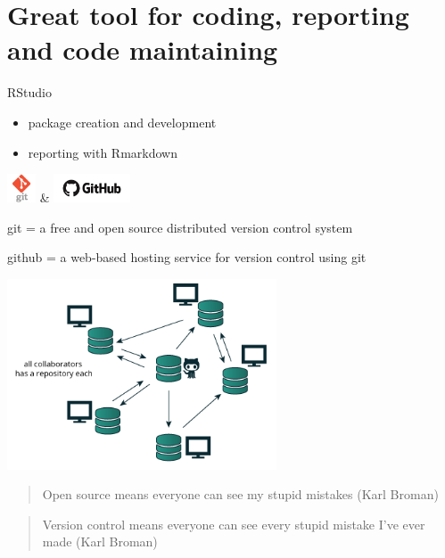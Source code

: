 \documentclass[9pt,ignorenonframetext,]{beamer}
\providecommand{\tightlist}{%
  \setlength{\itemsep}{0pt}\setlength{\parskip}{0pt}}
\begin{document}
\section{Great tool for coding, reporting and code
maintaining}\label{great-tool-for-coding-reporting-and-code-maintaining}

\begin{frame}{RStudio}

\begin{itemize}
\tightlist
\item
  package creation and development
\item
  reporting with Rmarkdown
\end{itemize}

\end{frame}

\begin{frame}{\includegraphics[height=0.33333in]{imgPres/input/git-logo.png}
\& \includegraphics[height=0.33333in]{imgPres/input/github-logo.png}}

git = a free and open source distributed version control system

github = a web-based hosting service for version control using git

\includegraphics[width=0.60000\textwidth]{imgPres/input/distributed-vc.png}

\begin{quote}
Open source means everyone can see my stupid mistakes (Karl Broman)
\end{quote}

\begin{quote}
Version control means everyone can see every stupid mistake I've ever
made (Karl Broman)
\end{quote}

\end{frame}
\end{document}
